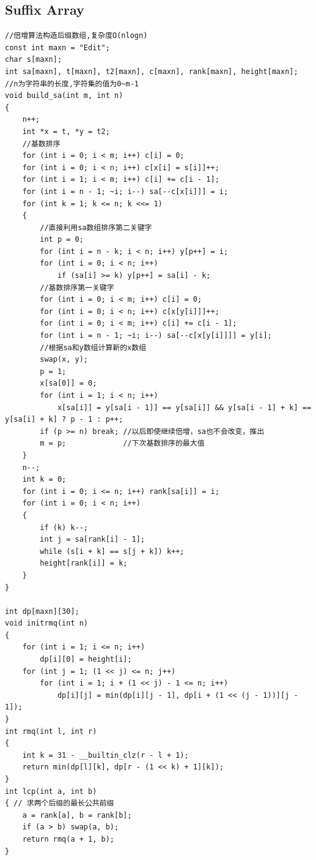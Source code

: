 \documentclass[twoside]{article}
\begin{document}
\subsection{Suffix Array}
\begin{lstlisting}
//倍增算法构造后缀数组,复杂度O(nlogn)
const int maxn = "Edit";
char s[maxn];
int sa[maxn], t[maxn], t2[maxn], c[maxn], rank[maxn], height[maxn];
//n为字符串的长度,字符集的值为0~m-1
void build_sa(int m, int n)
{
    n++;
    int *x = t, *y = t2;
    //基数排序
    for (int i = 0; i < m; i++) c[i] = 0;
    for (int i = 0; i < n; i++) c[x[i] = s[i]]++;
    for (int i = 1; i < m; i++) c[i] += c[i - 1];
    for (int i = n - 1; ~i; i--) sa[--c[x[i]]] = i;
    for (int k = 1; k <= n; k <<= 1)
    {
        //直接利用sa数组排序第二关键字
        int p = 0;
        for (int i = n - k; i < n; i++) y[p++] = i;
        for (int i = 0; i < n; i++)
            if (sa[i] >= k) y[p++] = sa[i] - k;
        //基数排序第一关键字
        for (int i = 0; i < m; i++) c[i] = 0;
        for (int i = 0; i < n; i++) c[x[y[i]]]++;
        for (int i = 0; i < m; i++) c[i] += c[i - 1];
        for (int i = n - 1; ~i; i--) sa[--c[x[y[i]]]] = y[i];
        //根据sa和y数组计算新的x数组
        swap(x, y);
        p = 1;
        x[sa[0]] = 0;
        for (int i = 1; i < n; i++)
            x[sa[i]] = y[sa[i - 1]] == y[sa[i]] && y[sa[i - 1] + k] == y[sa[i] + k] ? p - 1 : p++;
        if (p >= n) break; //以后即使继续倍增，sa也不会改变，推出
        m = p;             //下次基数排序的最大值
    }
    n--;
    int k = 0;
    for (int i = 0; i <= n; i++) rank[sa[i]] = i;
    for (int i = 0; i < n; i++)
    {
        if (k) k--;
        int j = sa[rank[i] - 1];
        while (s[i + k] == s[j + k]) k++;
        height[rank[i]] = k;
    }
}

int dp[maxn][30];
void initrmq(int n)
{
    for (int i = 1; i <= n; i++)
        dp[i][0] = height[i];
    for (int j = 1; (1 << j) <= n; j++)
        for (int i = 1; i + (1 << j) - 1 <= n; i++)
            dp[i][j] = min(dp[i][j - 1], dp[i + (1 << (j - 1))][j - 1]);
}
int rmq(int l, int r)
{
    int k = 31 - __builtin_clz(r - l + 1);
    return min(dp[l][k], dp[r - (1 << k) + 1][k]);
}
int lcp(int a, int b)
{ // 求两个后缀的最长公共前缀
    a = rank[a], b = rank[b];
    if (a > b) swap(a, b);
    return rmq(a + 1, b);
}
\end{lstlisting}
\end{document}
